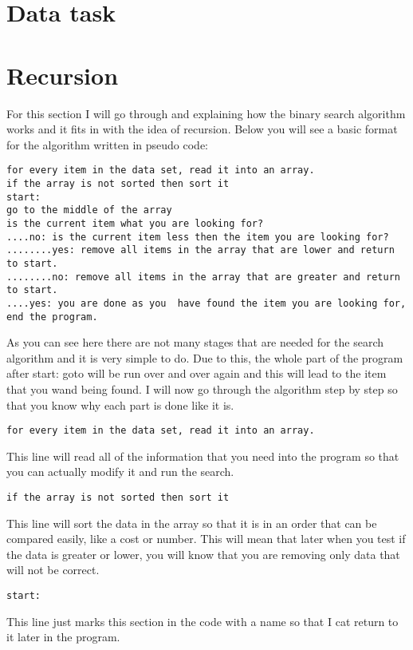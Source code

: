 \documentclass{article}
\begin{document}
\section{Data task}

\section{Recursion}
For this section I will go through and explaining how the binary search algorithm works and it fits in with the idea of recursion. Below you will see a basic format for the algorithm written in pseudo code:

\begin{verbatim}
for every item in the data set, read it into an array. 
if the array is not sorted then sort it
start:
go to the middle of the array 
is the current item what you are looking for?
....no: is the current item less then the item you are looking for?
........yes: remove all items in the array that are lower and return to start.
........no: remove all items in the array that are greater and return to start.
....yes: you are done as you  have found the item you are looking for, end the program. 
\end{verbatim}
As you can see here there are not many stages that are needed for the search algorithm and it is very simple to do. Due to this, the whole part of the program after start: goto will be run over and over again and this will lead to the item that you wand being found. I will now go through the algorithm step by step so that you know why each part is done like it is. 

\begin{verbatim}
for every item in the data set, read it into an array. 
\end{verbatim}
This line will read all of the information that you need into the program so that you can actually modify it and run the search. 

\begin{verbatim}
if the array is not sorted then sort it
\end{verbatim}
This line will sort the data in the array so that it is in an order that can be compared easily, like a cost or number. This will mean that later when you test if the data is greater or lower, you will know that you are removing only data that will not be correct. 

\begin{verbatim}
start:
\end{verbatim}
This line just marks this section in the code with a name so that I cat return to it later in the program. 
\end{document}
